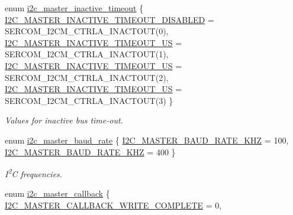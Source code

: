 \begin{DoxyCompactItemize}
enum \mbox{\hyperlink{group__asfdoc__sam0__sercom__i2c__group_ga4640bee224bf835f4c38d7702be0742c}{i2c\+\_\+master\+\_\+inactive\+\_\+timeout}} \{ \mbox{\hyperlink{group__asfdoc__sam0__sercom__i2c__group_gga4640bee224bf835f4c38d7702be0742ca52414c5127a26a6811f30324102cc3b1}{I2\+C\+\_\+\+M\+A\+S\+T\+E\+R\+\_\+\+I\+N\+A\+C\+T\+I\+V\+E\+\_\+\+T\+I\+M\+E\+O\+U\+T\+\_\+\+D\+I\+S\+A\+B\+L\+ED}} = S\+E\+R\+C\+O\+M\+\_\+\+I2\+C\+M\+\_\+\+C\+T\+R\+L\+A\+\_\+\+I\+N\+A\+C\+T\+O\+UT(0), 
\mbox{\hyperlink{group__asfdoc__sam0__sercom__i2c__group_gga4640bee224bf835f4c38d7702be0742ca9e204c432b52e77b4d34a5b64d4432e9}{I2\+C\+\_\+\+M\+A\+S\+T\+E\+R\+\_\+\+I\+N\+A\+C\+T\+I\+V\+E\+\_\+\+T\+I\+M\+E\+O\+U\+T\+\_\+US}} = S\+E\+R\+C\+O\+M\+\_\+\+I2\+C\+M\+\_\+\+C\+T\+R\+L\+A\+\_\+\+I\+N\+A\+C\+T\+O\+UT(1), 
\mbox{\hyperlink{group__asfdoc__sam0__sercom__i2c__group_gga4640bee224bf835f4c38d7702be0742ca9f37beb962cccc4538b0c226c921c553}{I2\+C\+\_\+\+M\+A\+S\+T\+E\+R\+\_\+\+I\+N\+A\+C\+T\+I\+V\+E\+\_\+\+T\+I\+M\+E\+O\+U\+T\+\_\+US}} = S\+E\+R\+C\+O\+M\+\_\+\+I2\+C\+M\+\_\+\+C\+T\+R\+L\+A\+\_\+\+I\+N\+A\+C\+T\+O\+UT(2), 
\mbox{\hyperlink{group__asfdoc__sam0__sercom__i2c__group_gga4640bee224bf835f4c38d7702be0742ca7412f98fd47572a75dc17727fdf735d0}{I2\+C\+\_\+\+M\+A\+S\+T\+E\+R\+\_\+\+I\+N\+A\+C\+T\+I\+V\+E\+\_\+\+T\+I\+M\+E\+O\+U\+T\+\_\+US}} = S\+E\+R\+C\+O\+M\+\_\+\+I2\+C\+M\+\_\+\+C\+T\+R\+L\+A\+\_\+\+I\+N\+A\+C\+T\+O\+UT(3)
 \}
\begin{DoxyCompactList}\small\item\em Values for inactive bus time-\/out. \end{DoxyCompactList}\item 
enum \mbox{\hyperlink{group__asfdoc__sam0__sercom__i2c__group_gace1e0023f2eee92565496a2e30006548}{i2c\+\_\+master\+\_\+baud\+\_\+rate}} \{ \mbox{\hyperlink{group__asfdoc__sam0__sercom__i2c__group_ggace1e0023f2eee92565496a2e30006548a24ddfbe034a690d3a553a17508cbd625}{I2\+C\+\_\+\+M\+A\+S\+T\+E\+R\+\_\+\+B\+A\+U\+D\+\_\+\+R\+A\+T\+E\+\_\+K\+HZ}} = 100, 
\mbox{\hyperlink{group__asfdoc__sam0__sercom__i2c__group_ggace1e0023f2eee92565496a2e30006548a970dccbbc3dd1d01c1070db6d9aa24cb}{I2\+C\+\_\+\+M\+A\+S\+T\+E\+R\+\_\+\+B\+A\+U\+D\+\_\+\+R\+A\+T\+E\+\_\+K\+HZ}} = 400
 \}
\begin{DoxyCompactList}\small\item\em I\textsuperscript{2}C frequencies. \end{DoxyCompactList}\item 
enum \mbox{\hyperlink{group__asfdoc__sam0__sercom__i2c__group_ga844ac2694772642cfee08a29c50bf054}{i2c\+\_\+master\+\_\+callback}} \{ \mbox{\hyperlink{group__asfdoc__sam0__sercom__i2c__group_gga844ac2694772642cfee08a29c50bf054a37c3aab3ceb2bddf4b42672386fd64f2}{I2\+C\+\_\+\+M\+A\+S\+T\+E\+R\+\_\+\+C\+A\+L\+L\+B\+A\+C\+K\+\_\+\+W\+R\+I\+T\+E\+\_\+\+C\+O\+M\+P\+L\+E\+TE}} = 0, 

\end{DoxyCompactItemize}
